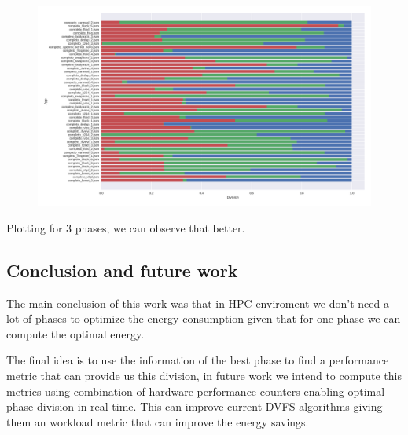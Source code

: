 \begin{figure}[H]
\includegraphics[width=\columnwidth]{phases/figures/phase_division_3.png}
\end{figure}
Plotting for 3 phases, we can observe that better.


\subsection{Conclusion and future work}
The main conclusion of this work was that in HPC enviroment we don't need a lot of phases to optimize the energy consumption given that for one phase we can compute the optimal energy.

The final idea is to use the information of the best phase to find a performance metric that can provide us this division, in future work we intend to compute this metrics using combination of hardware performance counters enabling optimal phase division in real time. This can improve current DVFS algorithms giving them an workload metric that can improve the energy savings.